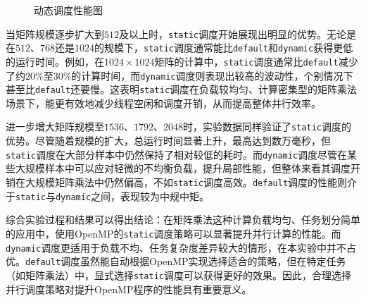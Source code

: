 \documentclass[a4paper, utf8]{ctexart}
\begin{document}
\begin{figure}[htbp]
\begin{minipage}{.32\textwidth}
			\caption{动态调度性能图}
		\end{minipage}
	\end{figure}
	
	当矩阵规模逐步扩大到$512$及以上时，\verb|static|调度开始展现出明显的优势。无论是在$512$、$768$还是$1024$的规模下，\verb|static|调度通常能比\verb|default|和\verb|dynamic|获得更低的运行时间。例如，在$1024\times1024$矩阵的计算中，\verb|static|调度通常比\verb|default|减少了约$20\%$至$30\%$的计算时间，而\verb|dynamic|调度则表现出较高的波动性，个别情况下甚至比\verb|default|还要慢。这表明\verb|static|调度在负载较均匀、计算密集型的矩阵乘法场景下，能更有效地减少线程空闲和调度开销，从而提高整体并行效率。
	
	进一步增大矩阵规模至$1536$、$1792$、$2048$时，实验数据同样验证了\verb|static|调度的优势。尽管随着规模的扩大，总运行时间显著上升，最高达到数万毫秒，但\verb|static|调度在大部分样本中仍然保持了相对较低的耗时。而\verb|dynamic|调度尽管在某些大规模样本中可以应对轻微的不均衡负载，提升局部性能，但整体来看其调度开销在大规模矩阵乘法中仍然偏高，不如\verb|static|调度高效。\verb|default|调度的性能则介于\verb|static|与\verb|dynamic|之间，表现较为中规中矩。
	
	综合实验过程和结果可以得出结论：在矩阵乘法这种计算负载均匀、任务划分简单的应用中，使用OpenMP的\verb|static|调度策略可以显著提升并行计算的性能。而\verb|dynamic|调度更适用于负载不均、任务复杂度差异较大的情形，在本实验中并不占优。\verb|default|调度虽然能自动根据OpenMP实现选择适合的策略，但在特定任务（如矩阵乘法）中，显式选择\verb|static|调度可以获得更好的效果。因此，合理选择并行调度策略对提升OpenMP程序的性能具有重要意义。
	
\end{document}
